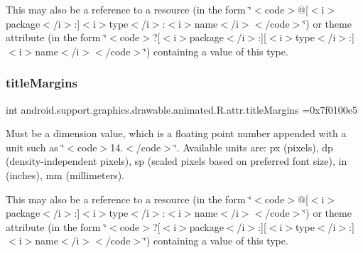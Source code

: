 This may also be a reference to a resource (in the form \char`\"{}$<$code$>$@\mbox{[}$<$i$>$package$<$/i$>$\+:\mbox{]}$<$i$>$type$<$/i$>$\+:$<$i$>$name$<$/i$>$$<$/code$>$\char`\"{}) or theme attribute (in the form \char`\"{}$<$code$>$?\mbox{[}$<$i$>$package$<$/i$>$\+:\mbox{]}\mbox{[}$<$i$>$type$<$/i$>$\+:\mbox{]}$<$i$>$name$<$/i$>$$<$/code$>$\char`\"{}) containing a value of this type. \mbox{\label{classandroid_1_1support_1_1graphics_1_1drawable_1_1animated_1_1R_1_1attr_a5de1a440af6f3cca3c605ffe3601581a}} 
\subsubsection{\texorpdfstring{title\+Margins}{titleMargins}}
{\footnotesize\ttfamily int android.\+support.\+graphics.\+drawable.\+animated.\+R.\+attr.\+title\+Margins =0x7f0100e5\hspace{0.3cm}{\ttfamily [static]}}

Must be a dimension value, which is a floating point number appended with a unit such as \char`\"{}$<$code$>$14.\+5sp$<$/code$>$\char`\"{}. Available units are\+: px (pixels), dp (density-\/independent pixels), sp (scaled pixels based on preferred font size), in (inches), mm (millimeters). 

This may also be a reference to a resource (in the form \char`\"{}$<$code$>$@\mbox{[}$<$i$>$package$<$/i$>$\+:\mbox{]}$<$i$>$type$<$/i$>$\+:$<$i$>$name$<$/i$>$$<$/code$>$\char`\"{}) or theme attribute (in the form \char`\"{}$<$code$>$?\mbox{[}$<$i$>$package$<$/i$>$\+:\mbox{]}\mbox{[}$<$i$>$type$<$/i$>$\+:\mbox{]}$<$i$>$name$<$/i$>$$<$/code$>$\char`\"{}) containing a value of this type. \mbox{\label{classandroid_1_1support_1_1graphics_1_1drawable_1_1animated_1_1R_1_1attr_a53e6cd396ad9e82f541969eb10792c38}} 
